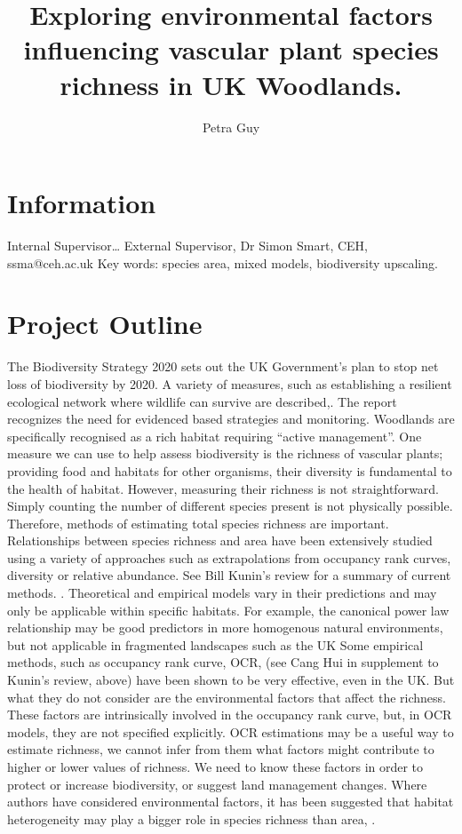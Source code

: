 \documentclass[a4paper]{article}
\title{Exploring environmental factors influencing vascular plant species richness in UK Woodlands.}
\author{Petra Guy}
\begin{document}
\maketitle


\section{Information}

Internal Supervisor…
External Supervisor, Dr Simon Smart, CEH, ssma@ceh.ac.uk
Key words: species area, mixed models, biodiversity upscaling.

\section{Project Outline}

The Biodiversity Strategy 2020 sets out the UK Government’s plan to stop net loss of biodiversity by 2020. A variety of measures, such as establishing a resilient ecological network where wildlife can survive are described,\cite{DeptEnv}. The report recognizes the need for evidenced based strategies and monitoring. Woodlands are specifically recognised as a rich habitat requiring “active management”. 
One measure we can use to help assess biodiversity is the richness of vascular plants; providing food and habitats for other organisms, their diversity is fundamental to the health of habitat. However, measuring their richness is not straightforward. Simply counting the number of different species present is not physically possible. Therefore, methods of estimating total species richness are important. 
Relationships between species richness and area have been extensively studied using a variety of approaches such as extrapolations from occupancy rank curves, diversity or relative abundance. See Bill Kunin’s review for a summary of current methods. \cite{kunin2017up}. Theoretical and empirical models vary in their predictions and may only be applicable within specific habitats. For example, the canonical power law relationship may be good predictors in more homogenous natural environments, but not applicable in fragmented landscapes such as the UK
Some empirical methods, such as occupancy rank curve, OCR, (see Cang Hui in supplement to Kunin’s review, above) have been shown to be very effective, even in the UK. But what they do not consider are the environmental factors that affect the richness. These factors are intrinsically involved in the occupancy rank curve, but, in OCR models, they are not specified explicitly. OCR estimations may be a useful way to estimate richness, we cannot infer from them what factors might contribute to higher or lower values of richness. We need to know these factors in order to protect or increase biodiversity, or suggest land management changes. Where authors have considered environmental factors, it has been suggested that habitat heterogeneity may play a bigger role in species richness than area, \cite{JBI:JBI1825, shen2009species}. 
\end{document}
